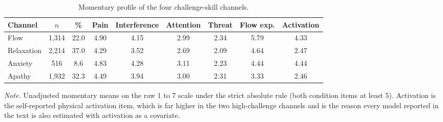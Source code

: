 \begin{table}[!htbp]
\raggedright
\caption{Momentary profile of the four challenge-skill channels.}
\label{tab:sup-channelprofiles}
\footnotesize
\begingroup
\setlength{\tabcolsep}{4pt}
\renewcommand{\arraystretch}{1.08}
\noindent
\begin{tabular*}{\textwidth}{@{\extracolsep{\fill}}lcccccccc@{}}
\toprule
Channel & $n$ & \% & Pain & Interference & Attention & Threat & Flow exp. & Activation \\
\midrule
Flow & 1,314 & 22.0 & 4.90 & 4.15 & 2.99 & 2.34 & 5.79 & 4.33 \\
Relaxation & 2,214 & 37.0 & 4.29 & 3.52 & 2.69 & 2.09 & 4.64 & 2.47 \\
Anxiety & 516 & 8.6 & 4.83 & 4.28 & 3.11 & 2.23 & 4.44 & 4.44 \\
Apathy & 1,932 & 32.3 & 4.49 & 3.94 & 3.00 & 2.31 & 3.33 & 2.46 \\
\bottomrule
\end{tabular*}
\par\vspace{3pt}\noindent\parbox{\textwidth}{\footnotesize\textit{Note.} Unadjusted momentary means on the raw 1 to 7 scale under the strict absolute rule (both condition items at least 5). Activation is the self-reported physical activation item, which is far higher in the two high-challenge channels and is the reason every model reported in the text is also estimated with activation as a covariate.}
\endgroup
\end{table}
